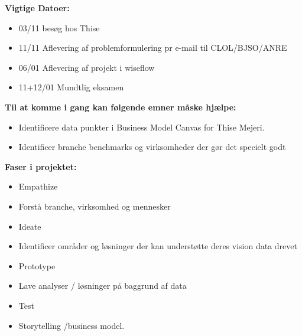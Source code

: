 \documentclass[
  12pt,
  a4paper,
  DIV=11,
  numbers=noendperiod]{scrartcl}
\providecommand{\tightlist}{%
  \setlength{\itemsep}{0pt}\setlength{\parskip}{0pt}}\usepackage{longtable,booktabs,array}
\begin{document}
\begin{itemize}
  \textbf{Vigtige Datoer:}~

  \begin{itemize}
  \item
    03/11 besøg hos Thise~
  \item
    11/11 Aflevering af problemformulering pr e-mail til CLOL/BJSO/ANRE~
  \item
    06/01 Aflevering af projekt i wiseflow~
  \item
    11+12/01 Mundtlig eksamen~
  \end{itemize}

  \textbf{Til at komme i gang kan følgende emner måske hjælpe:}~

  \begin{itemize}
  \item
    Identificere data punkter i Business Model Canvas for Thise Mejeri.~
  \item
    Identificer branche benchmarks og virksomheder der gør det specielt
    godt~
  \end{itemize}

  \textbf{Faser i projektet:}~

  \begin{itemize}
  \tightlist
  \item
    Empathize~
  \end{itemize}

  \begin{itemize}
  \tightlist
  \item
    Forstå branche, virksomhed og mennesker~
  \end{itemize}

  \begin{itemize}
  \tightlist
  \item
    Ideate~
  \end{itemize}

  \begin{itemize}
  \tightlist
  \item
    Identificer områder og løsninger der kan understøtte deres vision
    data drevet~
  \end{itemize}

  \begin{itemize}
  \tightlist
  \item
    Prototype~
  \end{itemize}

  \begin{itemize}
  \tightlist
  \item
    Lave analyser / løsninger på baggrund af data~
  \end{itemize}

  \begin{itemize}
  \item
    Test~
  \item
    Storytelling /business model.
  \end{itemize}
\end{itemize}
\end{document}
